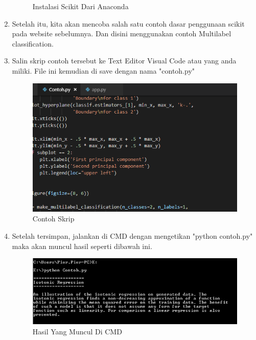 \begin{enumerate}
\begin{figure}
\begin{center}
   	 \caption{Instalasi Scikit Dari Anaconda}	
	\end{center}
\end{figure}
\item 
Setelah itu, kita akan mencoba salah satu contoh dasar penggunaan scikit pada website sebelumnya. Dan disini menggunakan contoh Multilabel classification.
\item 
Salin skrip contoh tersebut ke Text Editor Visual Code atau yang anda miliki. File ini kemudian di save dengan nama "contoh.py"
\begin{figure}
	\begin{center}
   	 \includegraphics[scale=1]{figures/contoh.png}
   	 \caption{Contoh Skrip}	
	\end{center}
\end{figure}
\item 
Setelah tersimpan, jalankan di CMD dengan mengetikan "python contoh.py" maka akan muncul hasil seperti dibawah ini.
\begin{figure}
	\begin{center}
   	 \includegraphics[scale=1]{figures/hasil1.png}
   	 \caption{Hasil Yang Muncul Di CMD}	
	\end{center}
\end{figure}
\begin{figure}
	\begin{center}

\end{center}
\end{figure}
\end{enumerate}
